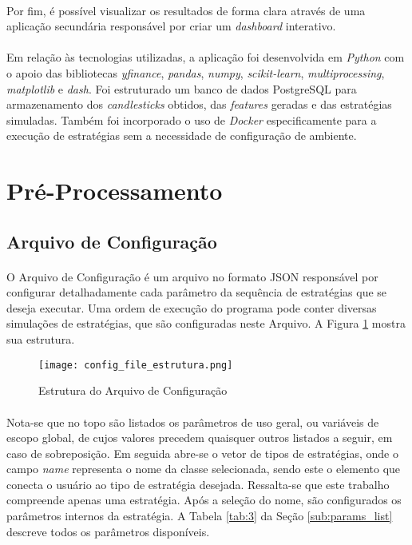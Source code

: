 \paragraph{} Por fim, é possível visualizar os resultados de forma clara através de uma aplicação secundária responsável por criar um \textit{dashboard} interativo.

\paragraph{} Em relação às tecnologias utilizadas, a aplicação foi desenvolvida em \textit{Python} com o apoio das bibliotecas \textit{yfinance}, \textit{pandas}, \textit{numpy}, \textit{scikit-learn}, \textit{multiprocessing}, \textit{matplotlib} e \textit{dash}. Foi estruturado um banco de dados PostgreSQL para armazenamento dos \textit{candlesticks} obtidos, das \textit{features} geradas e das estratégias simuladas. Também foi incorporado o uso de \textit{Docker} especificamente para a execução de estratégias sem a necessidade de configuração de ambiente.



\section{Pré-Processamento}

\subsection{Arquivo de Configuração}
\label{sub:conf_file}

\paragraph{} O Arquivo de Configuração é um arquivo no formato JSON responsável por configurar detalhadamente cada parâmetro da sequência de estratégias que se deseja executar. Uma ordem de execução do programa pode conter diversas simulações de estratégias, que são configuradas neste Arquivo. A Figura \ref{fig:101} mostra sua estrutura.

\begin{figure}[h]
    \texttt{[image: config\_file\_estrutura.png]}
    \centering
    \caption{Estrutura do Arquivo de Configuração}
    \label{fig:101}
\end{figure}

\paragraph{} Nota-se que no topo são listados os parâmetros de uso geral, ou variáveis de escopo global, de cujos valores precedem quaisquer outros listados a seguir, em caso de sobreposição. Em seguida abre-se o vetor de tipos de estratégias, onde o campo \textit{name} representa o nome da classe selecionada, sendo este o elemento que conecta o usuário ao tipo de estratégia desejada. Ressalta-se que este trabalho compreende apenas uma estratégia. Após a seleção do nome, são configurados os parâmetros internos da estratégia. A Tabela \ref{tab:3} da Seção \ref{sub:params_list} descreve todos os parâmetros disponíveis.

